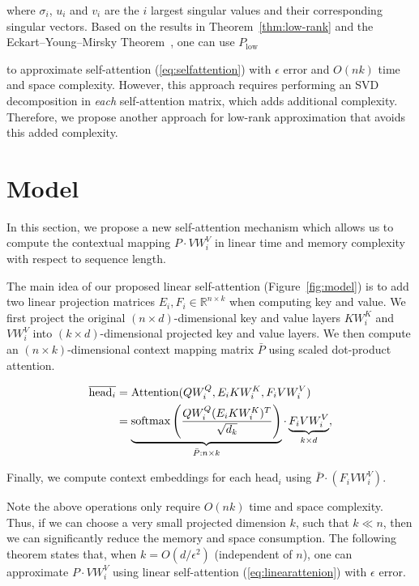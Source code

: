 where $\sigma_i$, $u_i$ and $v_i$ are the $i$ largest singular values and their corresponding singular vectors. Based on the results in Theorem~\ref{thm:low-rank} and the Eckart–Young–Mirsky Theorem~\citep{eckart1936approximation}, one can use
$P_\text{low}$ 

to approximate self-attention (\ref{eq:selfattention}) with $\epsilon$ error and $O(nk)$ time and space complexity. However, this approach requires performing an SVD decomposition in \textit{each} self-attention matrix, which adds additional complexity. Therefore, we propose another approach for low-rank approximation that avoids this added complexity.

\section{Model}

In this section, we propose a new self-attention mechanism which allows us to compute the contextual mapping $P\cdot VW_i^V$ in linear time and memory complexity with respect to sequence length.

The main idea of our proposed linear self-attention (Figure~\ref{fig:model}) is to add two linear projection matrices $E_i, F_i\in \mathbb{R}^{n\times k}$ when computing key and value. We first project the original $(n\times d)$-dimensional key and value layers $KW_i^K$ and $VW_i^V$ into $(k \times d)$-dimensional projected key and value layers. We then compute an $(n\times k)$-dimensional context mapping matrix $\bar{P}$ using scaled dot-product attention.

\begin{align}
\overline{\mbox{head}_i} &= \mbox{Attention}(QW_i^Q, E_iKW_i^K, F_iVW_i^V)\notag\\
&=\underbrace{\mbox{softmax}\left(\frac{QW_i^Q(E_iKW_i^K)^T}{\sqrt{d_k}}\right)}_{\bar{P}: n\times k}\cdot\underbrace{F_iVW_i^V}_{k\times d},\label{eq:linearattenion}
\end{align}

Finally, we compute context embeddings for each head$_i$ using $\bar{P}\cdot(F_iVW_i^V)$. 

Note the above operations only require $O(nk)$ time and space complexity. Thus, if we can choose a very small projected dimension $k$, such that $k\ll n$, then we can significantly reduce the memory and space consumption.  The following theorem states that, when $k=O(d/\epsilon^2)$ (independent of $n$), one can approximate $P\cdot VW_i^V$ using linear self-attention (\ref{eq:linearattenion}) with $\epsilon$ error.

